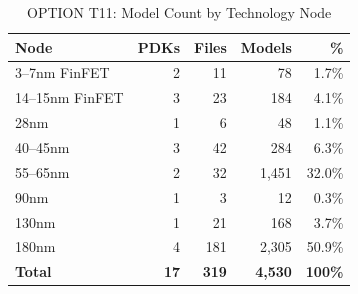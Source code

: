 \documentclass[conference]{IEEEtran}
\begin{document}
\begin{table}[!t]
\caption{OPTION T11: Model Count by Technology Node}
\label{tab:node_summary}
\centering
\renewcommand{\arraystretch}{1.2}
\begin{tabular}{@{}lrrrr@{}}
\toprule
\textbf{Node} & \textbf{PDKs} & \textbf{Files} & \textbf{Models} & \textbf{\%} \\
\midrule
3--7nm FinFET & 2 & 11 & 78 & 1.7\% \\
14--15nm FinFET & 3 & 23 & 184 & 4.1\% \\
28nm & 1 & 6 & 48 & 1.1\% \\
40--45nm & 3 & 42 & 284 & 6.3\% \\
55--65nm & 2 & 32 & 1,451 & 32.0\% \\
90nm & 1 & 3 & 12 & 0.3\% \\
130nm & 1 & 21 & 168 & 3.7\% \\
180nm & 4 & 181 & 2,305 & 50.9\% \\
\midrule
\textbf{Total} & \textbf{17} & \textbf{319} & \textbf{4,530} & \textbf{100\%} \\
\bottomrule
\end{tabular}
\end{table}
\end{document}
